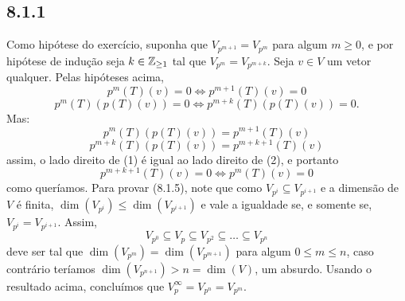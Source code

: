 \documentclass[../main.tex]{subfiles}
\begin{document}
\subsection*{8.1.1}
Como hipótese do exercício, suponha que \(V_{p^{m+1}}=V_{p^m}\)
para algum \(m\geq 0\), e por hipótese de indução seja \(k\in\mathbb{Z}_{\geq 1}\)
tal que \(V_{p^m}=V_{p^{m+k}}\). Seja $v\in V$ um vetor qualquer.
Pelas hipóteses acima,
\[p^m(T)(v)=0\iff p^{m+1}(T)(v)=0\tag{1}\]
\[p^m(T)(p(T)(v))=0\iff p^{m+k}(T)(p(T)(v))=0.\tag{2}\]
Mas:
 \[p^m(T)(p(T)(v))=p^{m+1}(T)(v)\] \[p^{m+k}(T)(p(T)(v))=
p^{m+k+1}(T)(v)\]
assim, o lado direito de (1) é igual ao lado direito de (2), e portanto
\[p^{m+k+1}(T)(v)=0\iff p^m(T)(v)=0\]
como queríamos. Para provar (8.1.5), note que como \(V_{p^i}
\subseteq V_{p^{i+1}}\) e a dimensão de \(V\) é finita, \(\dim(V_{p^i})\leq
\dim(V_{p^{i+1}})\) e vale a igualdade se, e somente se, 
\(V_{p^i}=V_{p^{i+1}}\). Assim, 
\[V_{p^0}\subseteq V_p\subseteq V_{p^2}\subseteq \dots\subseteq V_{p^n}\]
deve ser tal que \(\dim(V_{p^m})=\dim(V_{p^{m+1}})\) para algum \(0\leq
m\leq n\), caso contrário teríamos \(\dim(V_{p^{n+1}})> n=\dim(V)\),
um absurdo. Usando o resultado acima, concluímos que \(V_p^\infty=
V_{p^n}=V_{p^m}\).
\end{document}
